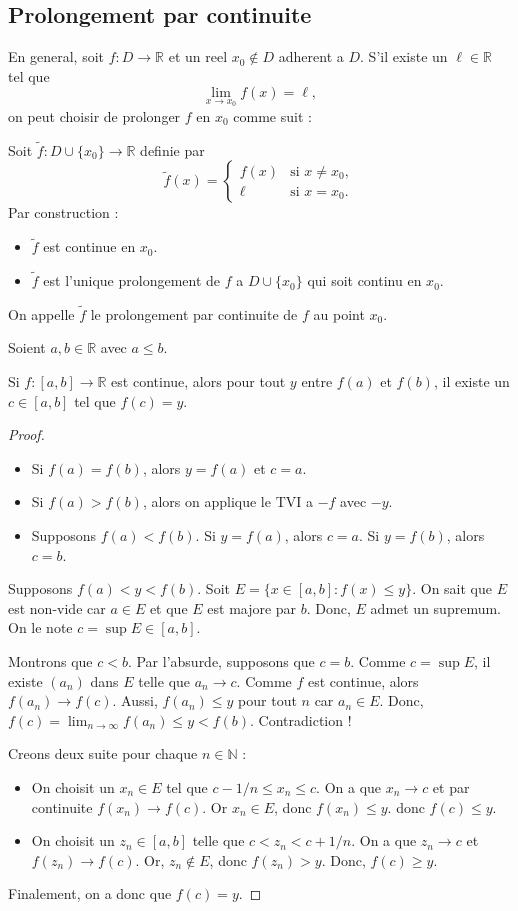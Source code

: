 \subsection*{Prolongement par continuite}
En general, soit $f:D\to \mathbb{R}$ et un reel $x_{0}\not\in D$ adherent a $D$. S'il existe un $\ell \in \mathbb{R}$ tel que 
$$
\lim_{ x \to x_{0} } f(x)=\ell,
$$
on peut choisir de prolonger $f$ en $x_{0}$ comme suit :
\begin{definition}
Soit $\tilde{f}:D\cup \{ x_{0} \}\to \mathbb{R}$ definie par 
$$
\tilde{f}(x)=\begin{cases}
f(x) & \text{si }x\neq x_{0}, \\
\ell & \text{si }x=x_{0}.
\end{cases}
$$
Par construction :
\begin{itemize}
\item $\tilde{f}$ est continue en $x_{0}$.
\item $\tilde{f}$ est l'unique prolongement de $f$ a $D\cup \{ x_{0} \}$ qui soit continu en $x_0$.
\end{itemize}
On appelle $\tilde{f}$ le prolongement par continuite de $f$ au point $x_{0}$.
\end{definition}


\begin{theorem}
Soient $a,b\in \mathbb{R}$ avec $a\le b$. 

Si $f:[a,b]\to \mathbb{R}$ est continue, alors pour tout $y$ entre $f(a)$ et $f(b)$, il existe un $c\in[a,b]$ tel que $f(c)=y$.
\end{theorem}
\begin{proof}
\begin{itemize}
\item Si $f(a)=f(b)$, alors $y=f(a)$ et $c=a$.
\item Si $f(a)>f(b)$, alors on applique le TVI a $-f$ avec $-y$.
\item Supposons $f(a)<f(b)$. Si $y=f(a)$, alors $c=a$. Si $y=f(b)$, alors $c=b$.
\end{itemize}
Supposons $f(a)<y<f(b)$. Soit $E=\{ x \in[a,b]:f(x)\le y\}$. On sait que $E$ est non-vide car $a\in E$ et que $E$ est majore par $b$. Donc, $E$ admet un supremum. On le note $c=\sup E\in[a,b]$.

Montrons que $c<b$. Par l'absurde, supposons que $c=b$. Comme $c=\sup E$, il existe $(a_{n})$ dans $E$ telle que $a_{n}\to c$. Comme $f$ est continue, alors $f(a_{n})\to f(c)$. Aussi, $f(a_{n})\le y$ pour tout $n$ car $a_{n}\in E$. Donc, $f(c)=\lim_{ n \to \infty }f(a_{n})\le y<f(b)$. Contradiction !

Creons deux suite pour chaque $n\in \mathbb{N}$ :
\begin{itemize}
\item On choisit un $x_{n}\in E$ tel que $c-1/n\le x_{n}\le c$. On a que $x_{n}\to c$ et par continuite $f(x_{n})\to f(c)$. Or $x_{n}\in E$, donc $f(x_{n})\le y$. donc $f(c)\le y$.
\item On choisit un $z_{n}\in[a,b]$ telle que $c<z_{n}<c+1/n$. On a que $z_{n}\to c$ et $f(z_{n})\to f(c)$. Or, $z_{n}\not\in E$, donc $f(z_{n})>y$. Donc, $f(c)\ge y$.
\end{itemize}
Finalement, on a donc que $f(c)=y$.
\end{proof}
